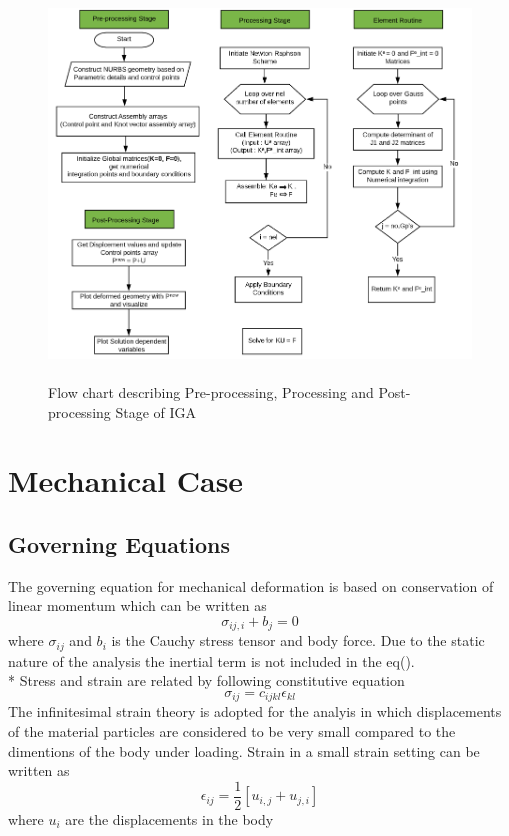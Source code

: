 \documentclass[12pt]{article}
\begin{document}
		\begin{figure}[H]
	\begin{center}
		\includegraphics[scale=0.7]{FlowChart_cropped.png} 
		\caption{\\Flow chart describing Pre-processing, Processing and Post-processing Stage of IGA}\label{FlowChart1}
	\end{center}
	
\end{figure}


\section{Mechanical Case}


\subsection{Governing Equations}
The governing equation for mechanical deformation is based on conservation of linear momentum which can be written as
\begin{equation}
\sigma_{ij,i} + b_j = 0
\end{equation}
where $ \sigma_{ij} $ and $ b_i $ is the Cauchy stress tensor and body force. Due to the static nature of the analysis the inertial term is not included in the eq().\\*
Stress and strain are related by following constitutive equation
\begin{equation}
\sigma_{ij} = c_{ijkl} \epsilon_{kl}
\end{equation}
The infinitesimal strain theory is adopted for the analyis in which displacements of the material particles are considered to be very small compared to the dimentions of the body under loading. Strain in a small strain setting can be written as
\begin{equation}
\epsilon_{ij}=\frac{1}{2}[u_{i,j}+u_{j,i}]
\end{equation}
where $ u_{i} $ are the displacements in the body
\end{document}

